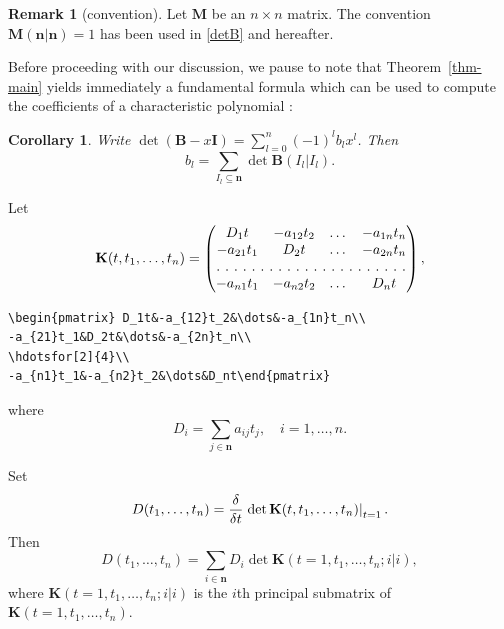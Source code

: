 \documentclass[manuscript, printscheme]{aomart}
\newtheorem[{}\it]{thm}{Theorem}[section]
\newtheorem{cor}[thm]{Corollary}
\theoremstyle{definition}
\newtheorem{rem}{Remark}[section]
\newtheorem*[{}\it]{notation}{Notation}
\newcommand{\thmref}[1]{Theorem~\ref{#1}}
\newcommand{\eval}[2][\right]{\relax
  \ifx#1\right\relax \left.\fi#2#1\rvert}
\begin{document}
\begin{rem}[convention]
Let $\mathbf{M}$ be an $n\times n$ matrix. The convention
$\mathbf{M}(\mathbf{n}|\mathbf{n})=1$ has been used in \eqref{detB} and
hereafter.
\end{rem}

Before proceeding with our discussion, we pause to note that
\thmref{thm-main} yields immediately a fundamental formula which can be
used to compute the coefficients of a characteristic polynomial
\cite{mami:matrixth}:
\begin{cor}\label{BI}
Write $\det(\mathbf{B}-x\mathbf{I})=\sum^n_{l =0}(-1)
^l b_l x^l $. Then
\begin{equation}\label{bl-sum}
b_l =\sum_{I_l \subseteq\mathbf{n}}\det\mathbf{B}(I_l |I_l ).
\end{equation}
\end{cor}
Let
\begin{equation}
\mathbf{K}(t,t_1,\dots,t_n)
=\begin{pmatrix} D_1t&-a_{12}t_2&\dots&-a_{1n}t_n\\
-a_{21}t_1&D_2t&\dots&-a_{2n}t_n\\
\hdotsfor[2]{4}\\
-a_{n1}t_1&-a_{n2}t_2&\dots&D_nt\end{pmatrix},
\end{equation}
\begin{verbatim}
\begin{pmatrix} D_1t&-a_{12}t_2&\dots&-a_{1n}t_n\\
-a_{21}t_1&D_2t&\dots&-a_{2n}t_n\\
\hdotsfor[2]{4}\\
-a_{n1}t_1&-a_{n2}t_2&\dots&D_nt\end{pmatrix}
\end{verbatim}
where
\begin{equation}
D_i=\sum_{j\in\mathbf{n}}a_{ij}t_j,\quad i=1,\dots,n.
\end{equation}

Set
\begin{equation*}
D(t_1,\dots,t_n)=\frac{\delta}{\delta t}\eval{\det\mathbf{K}(t,t_1,\dots,t_n)
}_{t=1}.
\end{equation*}
Then
\begin{equation}\label{sum-Di}
D(t_1,\dots,t_n)
=\sum_{i\in\mathbf{n}}D_i\det\mathbf{K}(t=1,t_1,\dots,t_n; i|i),
\end{equation}
where $\mathbf{K}(t=1,t_1,\dots,t_n; i|i)$ is the $i$th principal
submatrix of $\mathbf{K}(t=1,t_1,\dots,t_n)$.
\end{document}
